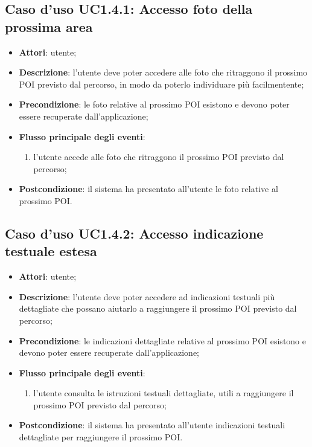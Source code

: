 \documentclass[../AnalisiDeiRequisiti.tex]{subfiles}
\begin{document}
\subsection{Caso d'uso UC1.4.1: Accesso foto della prossima area}
\begin{itemize}
	\item \textbf{Attori}: utente;
	\item \textbf{Descrizione}: l'utente deve poter accedere alle foto che ritraggono il prossimo POI previsto dal percorso, in modo da poterlo individuare più facilmentente; 
	\item \textbf{Precondizione}: le foto relative al prossimo POI esistono e devono poter essere recuperate dall'applicazione;
	
	\item \textbf{Flusso principale degli eventi}:
	\begin{enumerate}
		\item l'utente accede alle foto che ritraggono il prossimo POI previsto dal percorso;
		
	\end{enumerate}
	\item \textbf{Postcondizione}: il sistema ha presentato all'utente le foto relative al prossimo POI.
\end{itemize}
\hypertarget{UC1.4.2}{}
\subsection{Caso d'uso UC1.4.2: Accesso indicazione testuale estesa}
\begin{itemize}
	\item \textbf{Attori}: utente;
	\item \textbf{Descrizione}: l'utente deve poter accedere ad indicazioni testuali più dettagliate che possano aiutarlo a raggiungere il prossimo POI previsto dal percorso; 
	\item \textbf{Precondizione}: le indicazioni dettagliate relative al prossimo POI esistono e devono poter essere recuperate dall'applicazione;
	
	\item \textbf{Flusso principale degli eventi}:
	\begin{enumerate}
		\item l'utente consulta le istruzioni testuali dettagliate, utili a raggiungere il prossimo POI previsto dal percorso;
		
	\end{enumerate}
	\item \textbf{Postcondizione}: il sistema ha presentato all'utente indicazioni testuali dettagliate per raggiungere il prossimo POI.
\end{itemize}
\hypertarget{UC1.4.3}{}
\end{document}
